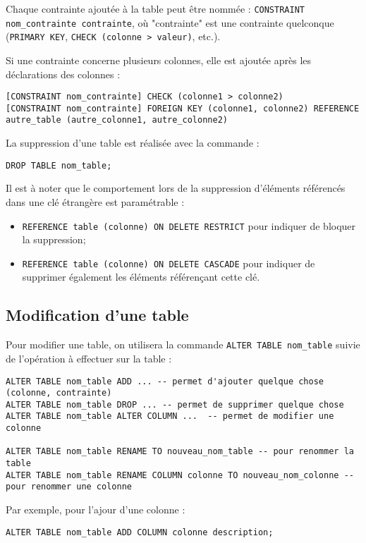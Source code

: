 \documentclass[11pt]{article}
\begin{document}
				Chaque contrainte ajoutée à la table peut être nommée : \lstinline{CONSTRAINT nom_contrainte contrainte}, où "contrainte" est une contrainte quelconque (\lstinline{PRIMARY KEY}, \lstinline{CHECK (colonne > valeur)}, etc.).
				
				Si une contrainte concerne plusieurs colonnes, elle est ajoutée après les déclarations des colonnes :
				\begin{lstlisting}
[CONSTRAINT nom_contrainte] CHECK (colonne1 > colonne2)
[CONSTRAINT nom_contrainte] FOREIGN KEY (colonne1, colonne2) REFERENCE autre_table (autre_colonne1, autre_colonne2)
				\end{lstlisting}
				
				
				La suppression d'une table est réalisée avec la commande :
				\begin{lstlisting}
DROP TABLE nom_table;
				\end{lstlisting}
				
				Il est à noter que le comportement lors de la suppression d'éléments référencés dans une clé étrangère est paramétrable :
				\begin{itemize}
					\item \lstinline{REFERENCE table (colonne) ON DELETE RESTRICT} pour indiquer de bloquer la suppression;
					\item \lstinline{REFERENCE table (colonne) ON DELETE CASCADE} pour indiquer de supprimer également les éléments référençant cette clé.
				\end{itemize}
				
				
			
			\subsection{Modification d'une table}
				Pour modifier une table, on utilisera la commande \lstinline{ALTER TABLE nom_table} suivie de l'opération à effectuer sur la table : 
				\begin{lstlisting}
ALTER TABLE nom_table ADD ... -- permet d'ajouter quelque chose (colonne, contrainte)
ALTER TABLE nom_table DROP ... -- permet de supprimer quelque chose
ALTER TABLE nom_table ALTER COLUMN ...  -- permet de modifier une colonne

ALTER TABLE nom_table RENAME TO nouveau_nom_table -- pour renommer la table
ALTER TABLE nom_table RENAME COLUMN colonne TO nouveau_nom_colonne -- pour renommer une colonne
				\end{lstlisting}
			
			
				Par exemple, pour l'ajour d'une colonne :
				\begin{lstlisting}
ALTER TABLE nom_table ADD COLUMN colonne description;
				\end{lstlisting}
			
\end{document}
